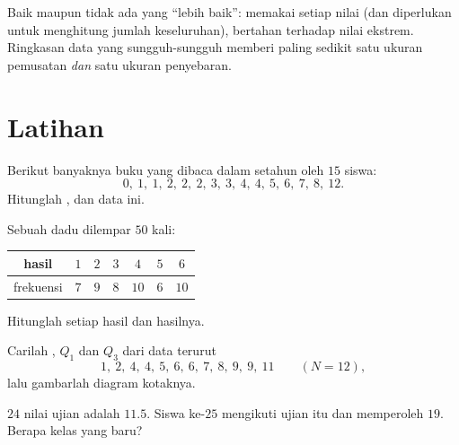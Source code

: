 \begin{remark}
Baik  maupun  tidak ada yang ``lebih baik'':  memakai
setiap nilai (dan diperlukan untuk menghitung jumlah keseluruhan), 
bertahan terhadap nilai ekstrem. Ringkasan data yang sungguh-sungguh memberi
paling sedikit satu ukuran pemusatan \emph{dan} satu ukuran penyebaran.
\end{remark}

\section{Latihan}

\begin{exercise}[$\star$]\label{exo:g10:stats:1}
Berikut banyaknya buku yang dibaca dalam setahun oleh $15$ siswa:
\[
0,\ 1,\ 1,\ 2,\ 2,\ 2,\ 3,\ 3,\ 4,\ 4,\ 5,\ 6,\ 7,\ 8,\ 12 .
\]
Hitunglah ,  dan  data ini.
\end{exercise}

\begin{exercise}[$\star$]\label{exo:g10:stats:2}
Sebuah dadu dilempar $50$ kali:
\begin{center}
\renewcommand{\arraystretch}{1.2}
\begin{tabular}{c|cccccc}
hasil & $1$ & $2$ & $3$ & $4$ & $5$ & $6$ \\
\hline
frekuensi & $7$ & $9$ & $8$ & $10$ & $6$ & $10$ \\
\end{tabular}
\end{center}
Hitunglah  setiap hasil dan  hasilnya.
\end{exercise}

\begin{exercise}[$\star$]\label{exo:g10:stats:3}
Carilah , $Q_1$ dan $Q_3$ dari data terurut
\[
1,\ 2,\ 4,\ 4,\ 5,\ 6,\ 6,\ 7,\ 8,\ 9,\ 9,\ 11 \qquad (N = 12),
\]
lalu gambarlah diagram kotaknya.
\end{exercise}

\begin{exercise}[$\star$]\label{exo:g10:stats:4}
 $24$ nilai ujian adalah $11.5$. Siswa ke-$25$ mengikuti ujian itu
dan memperoleh $19$. Berapa  kelas yang baru?
\end{exercise}

